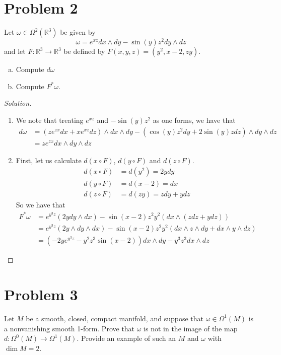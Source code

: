 \documentclass[a4paper]{article}
\begin{document}
\section*{Problem 2}%
Let $\omega \in \Omega^2(\mathds{R}^3)$ be given by
\[
  \omega = e^{xz} dx \wedge dy - \sin(y)z^2 dy \wedge dz
\]
and let $F: \mathds{R}^3 \rightarrow \mathds{R}^3$ be defined by $F(x,y,z) = (y^2, x - 2, zy)$.
\begin{enumerate}[(a)]
  \item Compute $d\omega$
  \item Compute $F^*\omega$.
\end{enumerate}

\begin{proof}[Solution]
  \begin{enumerate}
    \item We note that treating $e^{xz}$ and $-\sin(y)z^2$ as one forms, we have that
      \[
        \begin{aligned}
          d\omega &= (ze^{zx}dx +  xe^{xz}dz)\wedge dx \wedge dy - (\cos(y)z^2dy + 2\sin(y)zdz) \wedge  dy \wedge dz \\
                  &= ze^{zx} dx \wedge dy \wedge dz
        \end{aligned}
      \]
    \item First, let us calculate $d(x \circ F)$, $d(y \circ F)$ and $d(z \circ F)$.
      \[
        \begin{aligned}
          d(x \circ F) &= d(y^2) = 2y dy \\
          d(y \circ F) &= d(x-2) = dx \\
          d(z \circ F) &= d(zy) = zdy + ydz
        \end{aligned}
      \]
      So we have that
      \[
        \begin{aligned}
        F^*\omega &= e^{y^3z}(2ydy \wedge dx) -\sin(x-2)z^2y^2(dx \wedge (zdz + ydz)) \\
                  &= e^{y^3z}(2y \wedge dy \wedge dx) - \sin(x-2)z^2y^2(dx \wedge z \wedge dy + dx \wedge y \wedge dz)  \\
                  &= (-2y e^{y^3z} - y^2z^3 \sin(x-2))dx \wedge dy - y^3z^3 dx \wedge dz
        \end{aligned}
      \]
  \end{enumerate}
\end{proof}

\section*{Problem 3}%
Let $M$ be a smooth, closed, compact manifold, and suppose that $\omega \in \Omega^1(M)$ is a  nonvanishing smooth 1-form. Prove that $\omega$ is not in the image of the map $d: \Omega^0(M) \rightarrow \Omega^1(M)$. Provide an example of such an $M$ and $\omega$ with $\dim M = 2$.
\end{document}
